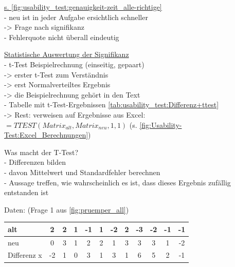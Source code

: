 \noindent
\underline{s. \autoref{fig:usability_test:genauigkeit-zeit_alle-richtige}}\\
- neu ist in jeder Aufgabe ersichtlich schneller\\
-> Frage nach signifikanz\\
- Fehlerquote nicht überall eindeutig\\

\newpage

\noindent
\underline{Statistische Auswertung der Signifikanz}\\
\label{Bsp:ttest}
\label{Beispielrechnung:TTest}
- t-Test Beispielrechnung (einseitig, gepaart)\\
-> erster t-Test zum Verständnis\\
-> erst Normalverteiltes Ergebnis\cite{normalverteilung_rechner}\\
-> die Beispielrechnung gehört in den Text \cite{Statistik:Boertz:2010} \cite{Statistik:Sedlmeier:2024}\\
- Tabelle mit t-Test-Ergebnissen \autoref{tab:usability_test:Differenz+ttest}\\
-> Rest: verweisen auf Ergebnisse aus Excel: $=TTEST(Matrix_{alt}, Matrix_{neu},1,1)$ (s. \autoref{fig:Usability-Test:Excel_Berechnungen})

\noindent
Was macht der T-Test?\\
- Differenzen bilden\\
- davon Mittelwert und Standardfehler berechnen\\
- Aussage treffen, wie wahrscheinlich es ist, dass dieses Ergebnis zufällig entstanden ist\\

\noindent
\begin{table}[H]
Daten: (Frage 1 aus \autoref{fig:pruemper_all})\\
\begin{tabular}{|l|c|c|c|c|c|c|c|c|c|c|c|}
    \hline
    alt         &  2 & 2 & 1 & -1 & 1 & -2 & 2 & -3 & -2 & -1 & -1 \\ \hline
    neu         &  0 & 3 & 1 &  2 & 2 &  1 & 3 &  3 &  3 &  1 & -2 \\ \hline
    \hline
    Differenz x  & -2 & 1 & 0 &  3 & 1 &  3 & 1 &  6 &  5 &  2 & -1 \\
    \hline
\end{tabular}
\end{table}

